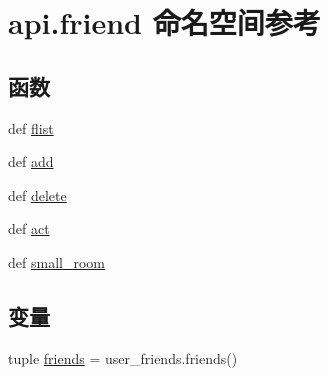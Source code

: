 \hypertarget{namespaceapi_1_1friend}{\section{api.\-friend 命名空间参考}
\label{namespaceapi_1_1friend}
}
\subsection*{函数}
\begin{DoxyCompactItemize}
\item 
def \hyperlink{namespaceapi_1_1friend_aea90f0cabb089c74dfeaf27fc1a4f1f3}{flist}
\item 
def \hyperlink{namespaceapi_1_1friend_a506edbf245a09a1b05acee05e4eee967}{add}
\item 
def \hyperlink{namespaceapi_1_1friend_a998bc2b134f637096d118a9038e23bf1}{delete}
\item 
def \hyperlink{namespaceapi_1_1friend_a65737800446036fc2cd37a88d6a18097}{act}
\item 
def \hyperlink{namespaceapi_1_1friend_a189bd8d0e4d01ddd3216f5bf1aa06473}{small\-\_\-room}
\end{DoxyCompactItemize}
\subsection*{变量}
\begin{DoxyCompactItemize}
\item 
tuple \hyperlink{namespaceapi_1_1friend_a39f850f8015aebef85ad6ed8be767890}{friends} = user\-\_\-friends.\-friends()
\end{DoxyCompactItemize}


